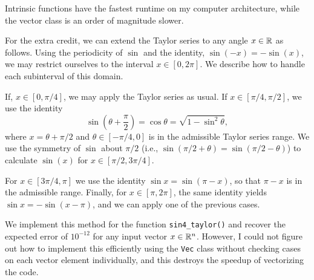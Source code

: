 \begin{questions}
\begin{solution}
    Intrinsic functions have the fastest runtime on my computer architecture,
    while the vector class is an order of magnitude slower.
    
    For the extra credit, we can extend the Taylor series to any angle $x \in \mathbb{R}$
    as follows. Using the periodicity of $\sin$ and the identity, $\sin(-x) = -\sin(x)$,
    we may restrict ourselves to the interval $x \in [0, 2\pi]$. We describe
    how to handle each subinterval of this domain.
    
    If, $x \in [0,\pi/4]$,
    we may apply the Taylor series as usual.
    If $x \in [\pi/4, \pi/2]$, we use the identity
    \[
    \sin(\theta + \frac\pi 2) = \cos\theta = \sqrt{1 - \sin^2\theta},
    \]
    where $x = \theta + \pi/2$ and $\theta \in [-\pi/4, 0]$ is in the
    admissible Taylor series range.
    We use the symmetry of $\sin$ about $\pi/2$ (i.e.,
    $\sin(\pi/2 + \theta) = \sin(\pi/2 - \theta)$) to calculate
    $\sin(x)$ for $x \in [\pi/2, 3\pi/4]$. 
    
    For $x \in [3\pi/4, \pi]$ we use the identity 
    $\sin x = \sin(\pi - x)$, so that $\pi-x$ is in the admissible range.
    Finally, for $x \in [\pi, 2\pi]$, the same identity yields
    $\sin x = -\sin(x-\pi)$, and we can apply one of the previous cases.
    
    We implement this method for the function \texttt{sin4\_taylor()}
    and recover the expected error of $10^{-12}$ for any input
    vector $x \in \mathbb{R}^n$. However, I could not figure out how to implement
    this efficiently using the \texttt{Vec} class without checking cases on
    each vector element individually, and this destroys the speedup
    of vectorizing the code.
\end{solution}







\end{questions}
